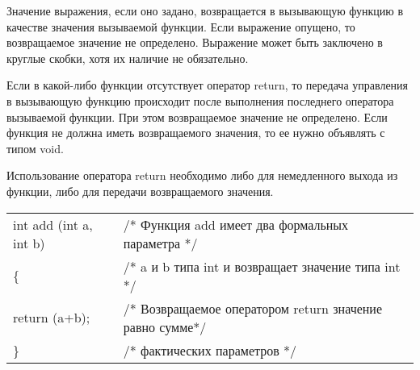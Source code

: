 Значение выражения, если оно задано, возвращается в вызывающую функцию в качестве значения вызываемой функции. Если выражение опущено, то возвращаемое значение не определено. Выражение может быть заключено в круглые скобки, хотя их наличие не обязательно.\killoverfullbefore

Если в какой-либо функции отсутствует оператор return, то передача управления в вызывающую функцию происходит после выполнения последнего оператора вызываемой функции. При этом возвращаемое значение не определено. Если функция не должна иметь возвращаемого значения, то ее нужно объявлять с типом void. \killoverfullbefore

Использование оператора return необходимо либо для немедленного выхода из функции, либо для передачи возвращаемого значения. \killoverfullbefore \BL

\begin{pExample}
\begin{tabular}{ l l }
int add (int a, int b)  & \textcolor{exComm}{/* Функция add имеет два формальных параметра */} \\
\{  & \textcolor{exComm}{/* a и b типа int и возвращает значение типа int */} \\
\indent return (a+b); & \textcolor{exComm}{/* Возвращаемое оператором return значение равно сумме*/} \\
\} & \textcolor{exComm}{/* фактических параметров */} \\
\end{tabular}
\end{pExample}

\clearpage